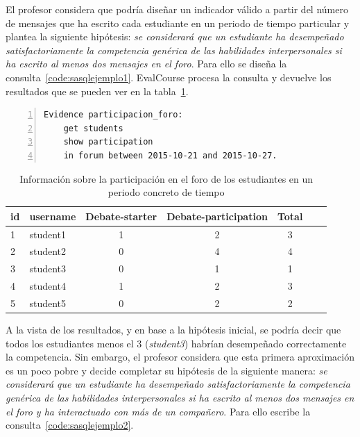 
El profesor considera que podría diseñar un indicador válido a partir del número de mensajes que ha escrito cada estudiante en un periodo de tiempo particular y plantea la siguiente hipótesis: \emph{se considerará que un estudiante ha desempeñado satisfactoriamente la competencia genérica de las habilidades interpersonales si ha escrito al menos dos mensajes en el foro}. Para ello se diseña la consulta~\ref{code:sasqlejemplo1}. EvalCourse procesa la consulta y devuelve los resultados que se pueden ver en la tabla~\ref{tab:EvalCourseEj1}.

\begin{lstlisting}[caption=Participación en el foro en un periodo concreto de tiempo ,label=code:sasqlejemplo1,numbers=left, captionpos=b, morekeywords={Evidence,get, students, show, milestones, participation, access, in, assignment, forum, campus, workshop, interaction, between, and}]
Evidence participacion_foro: 
	get students
	show participation
	in forum between 2015-10-21 and 2015-10-27.
\end{lstlisting}

\begin{table}
	\centering
	\caption{Información sobre la participación en el foro de los estudiantes en un periodo concreto de tiempo}
	\label{tab:EvalCourseEj1}
	\begin{tabular}{|l|l|c|c|c|c|c|}
		\hline
		id & username & Debate-starter & Debate-participation & Total \\
		\hline
		\hline
		1 & student1 & 1 & 2 & 3  \\
		\hline
		2 & student2 & 0 & 4 & 4  \\
		\hline
		3 & student3 & 0 & 1 & 1  \\
		\hline
		4 & student4 & 1 & 2 & 3  \\
		\hline
		5 & student5 & 0 & 2 & 2  \\
		\hline
	\end{tabular}
\end{table}

A la vista de los resultados, y en base a la hipótesis inicial, se podría decir que todos los estudiantes menos el 3 (\emph{student3}) habrían desempeñado correctamente la competencia. Sin embargo, el profesor considera que esta primera aproximación es un poco pobre y decide completar su hipótesis de la siguiente manera: \emph{se considerará que un estudiante ha desempeñado satisfactoriamente la competencia genérica de las habilidades interpersonales si ha escrito al menos dos mensajes en el foro y ha interactuado con más de un compañero}. Para ello escribe la consulta~\ref{code:sasqlejemplo2}. 

